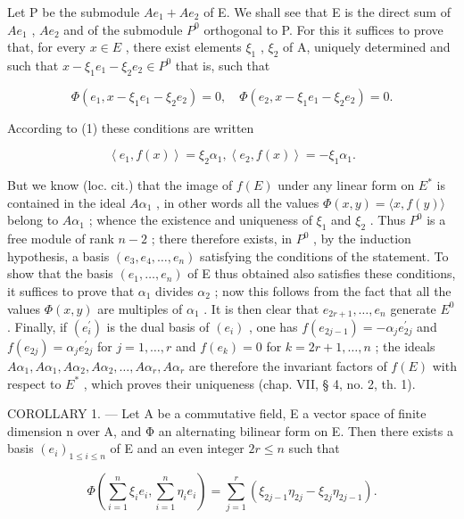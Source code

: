 Let P be the submodule \(Ae_{1} + Ae_{2}\) of E. We shall see that E is the direct sum of \(Ae_{1}\) , \(Ae_{2}\) and of the submodule \(P^{0}\) orthogonal to P. For this it suffices to prove that, for every \(x \in E\) , there exist elements \(\xi_{1}\) , \(\xi_{2}\) of A, uniquely determined and such that \(x - \xi_{1}e_{1} - \xi_{2}e_{2} \in P^{0}\) that is, such that

\[
\Phi (e _ {1}, x - \xi_ {1} e _ {1} - \xi_ {2} e _ {2}) = 0, \quad \Phi (e _ {2}, x - \xi_ {1} e _ {1} - \xi_ {2} e _ {2}) = 0.
\]

According to (1) these conditions are written

\[
\left\langle e _ {1}, f (x) \right\rangle = \xi_ {2} \alpha_ {1}, \left\langle e _ {2}, f (x) \right\rangle = - \xi_ {1} \alpha_ {1}.
\]

But we know (loc. cit.) that the image of \(f(E)\) under any linear form on \(E^{*}\) is contained in the ideal \(A\alpha_{1}\) , in other words all the values \(\Phi(x,y)=\langle x,f(y)\rangle\) belong to \(A\alpha_{1}\) ; whence the existence and uniqueness of \(\xi_{1}\) and \(\xi_{2}\) . Thus \(P^{0}\) is a free module of rank \(n-2\) ; there therefore exists, in \(P^{0}\) , by the induction hypothesis, a basis \((e_{3},e_{4},\ldots,e_{n})\) satisfying the conditions of the statement. To show that the basis \((e_{1},\ldots,e_{n})\) of E thus obtained also satisfies these conditions, it suffices to prove that \(\alpha_{1}\) divides \(\alpha_{2}\) ; now this follows from the fact that all the values \(\Phi(x,y)\) are multiples of \(\alpha_{1}\) . It is then clear that \(e_{2r+1},\ldots,e_{n}\) generate \(E^{0}\) . Finally, if \((e_{i}^{\prime})\) is the dual basis of \((e_{i})\) , one has \(f(e_{2j-1})=-\alpha_{j}e_{2j}^{\prime}\) and \(f(e_{2j})=\alpha_{j}e_{2j}^{\prime}\) for \(j=1,\ldots,r\) and \(f(e_{k})=0\) for \(k=2r+1,\ldots,n\) ; the ideals \(A\alpha_{1},A\alpha_{1},A\alpha_{2},A\alpha_{2},\ldots,A\alpha_{r},A\alpha_{r}\) are therefore the invariant factors of \(f(E)\) with respect to \(E^{*}\) , which proves their uniqueness (chap. VII, § 4, no. 2, th. 1).

COROLLARY 1. --- Let A be a commutative field, E a vector space of finite dimension n over A, and Φ an alternating bilinear form on E. Then there exists a basis \((e_i)_{1\leqslant i\leqslant n}\) of E and an even integer \(2r\leqslant n\) such that

\[
\Phi (\sum_ {i = 1} ^ {n} \xi_ {i} e _ {i}, \sum_ {i = 1} ^ {n} \eta_ {i} e _ {i}) = \sum_ {j = 1} ^ {r} (\xi_ {2 j - 1} \eta_ {2 j} - \xi_ {2 j} \eta_ {2 j - 1}).\tag{2}
\]

